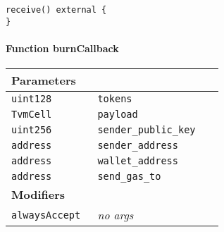\begin{lstlisting}[firstnumber=609]
receive() external {
}
\end{lstlisting}

\paragraph{Function burnCallback}


\ifsoltables
\noindent\begin{tabular}{|l|l|p{5cm}|}\hline
\multicolumn{3}{|l|}{\bf Parameters}\\\hline
\tt uint128 & \tt tokens &\\\hline
\tt TvmCell & \tt payload &\\\hline
\tt uint256 & \tt sender\_{}public\_{}key &\\\hline
\tt address & \tt sender\_{}address &\\\hline
\tt address & \tt wallet\_{}address &\\\hline
\tt address & \tt send\_{}gas\_{}to &\\\hline
\multicolumn{3}{|l|}{\bf Modifiers}\\\hline
\tt alwaysAccept & {\em no args} &\\\hline
\end{tabular}
\fi

\vspace{2cm}

